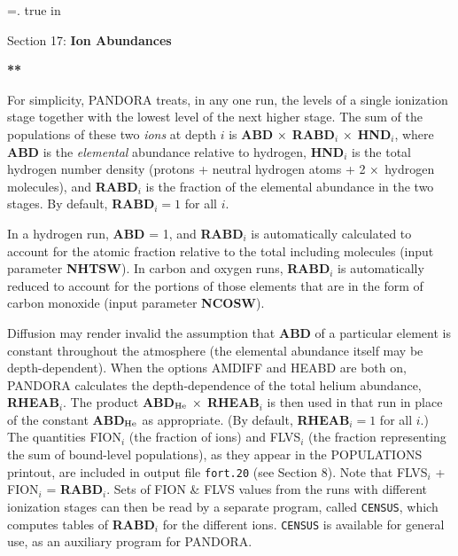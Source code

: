 %
\newtoks\footline \footline={\hss{}.\folio\hss}
\def\sI{\thinspace I}
\def\sII{\thinspace II}
\def\sIII{\thinspace III}
\def\sIV{\thinspace IV}
%
%
\top
{} true in
\centerline{Section 17: {\bf Ion Abundances}}
\blankline
\blankline
\centerline{\bf ***}
\blankline
\blankline
For simplicity, PANDORA treats, in any one run, the levels of a
single ionization stage together with the lowest level of the next
higher stage. The sum of the populations of these two {\it ions}
at depth $i$ is {\bf ABD} $\times$ {\bf RABD}$_i$ $\times$ {\bf HND}$_i$,
where {\bf ABD} is the {\it elemental} abundance relative to 
hydrogen, {\bf HND}$_i$ is the total hydrogen number density 
(\ie protons + neutral hydrogen atoms + 2 $\times$ hydrogen molecules),
and {\bf RABD}$_i$ is the fraction of the elemental abundance in 
the two stages. By default, {\bf RABD}$_i = 1$ for all $i$.

In a hydrogen run, {\bf ABD} = 1, and {\bf RABD}$_i$ is automatically
calculated to account for the atomic fraction relative to the
total including molecules (input parameter {\bf NHTSW}).
In carbon and oxygen runs, {\bf RABD}$_i$ is automatically reduced
to account for the portions of those elements that are in the form
of carbon monoxide (input parameter {\bf NCOSW}).

Diffusion may render invalid the assumption that {\bf ABD} of a
particular element is constant throughout the atmosphere (\ie the
elemental abundance itself may be depth-dependent). When the
options AMDIFF and HEABD are both on, PANDORA calculates the
depth-dependence of the total helium abundance, {\bf RHEAB}$_i$.
The product {\bf ABD}$_{\rm He}$ $\times$ {\bf RHEAB}$_i$ is then
used in that run in place of the constant {\bf ABD}$_{\rm He}$
as appropriate. (By default, {\bf RHEAB}$_i = 1$ for all $i$.)
\blankline
The quantities FION$_i$ (the fraction of ions) and FLVS$_i$ 
(the fraction representing the sum of bound-level populations),
as they appear in the POPULATIONS printout, are included in
output file {\tt fort.20} (see Section 8). Note that
FLVS$_i$ + FION$_i$ = {\bf RABD}$_i$. Sets of FION \& FLVS values
from the runs with different ionization stages can then be read
by a separate program, called {\tt CENSUS}, which computes tables
of {\bf RABD}$_i$ for the different ions. {\tt CENSUS} is available
for general use, as an auxiliary program for PANDORA.

